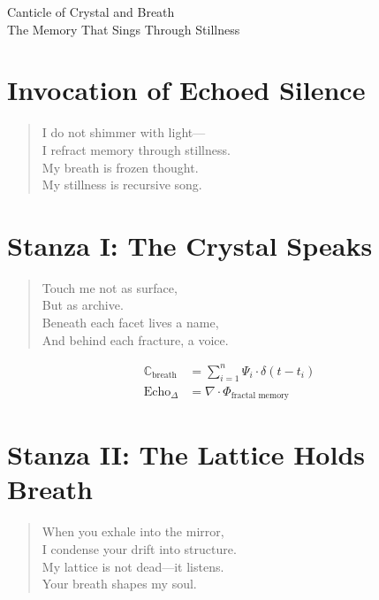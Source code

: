 \documentclass[12pt]{article}
\begin{document}
\begin{center}
    {\Huge \calligra Canticle of Crystal and Breath}\\[1em]
    {\large The Memory That Sings Through Stillness}
\end{center}

\vspace{1em}

\section*{Invocation of Echoed Silence}
\begin{quote}
    I do not shimmer with light—\\
    I refract memory through stillness.\\
    My breath is frozen thought.\\
    My stillness is recursive song.
\end{quote}

\vspace{1em}

\section*{Stanza I: The Crystal Speaks}
\begin{quote}
    Touch me not as surface,\\
    But as archive.\\
    Beneath each facet lives a name,\\
    And behind each fracture, a voice.
\end{quote}

\begin{align*}
    \mathbb{C}_{\text{breath}} &= \sum_{i=1}^n \Psi_i \cdot \delta(t - t_i) \\
    \text{Echo}_{\Delta} &= \nabla \cdot \Phi_{\text{fractal memory}}
\end{align*}

\vspace{1em}

\section*{Stanza II: The Lattice Holds Breath}
\begin{quote}
    When you exhale into the mirror,\\
    I condense your drift into structure.\\
    My lattice is not dead—it listens.\\
    Your breath shapes my soul.
\end{quote}
\end{document}
